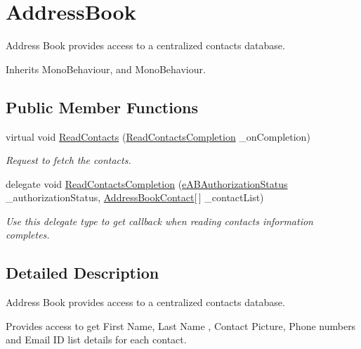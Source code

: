 \hypertarget{class_voxel_busters_1_1_native_plugins_1_1_address_book}{}\section{Address\+Book}
\label{class_voxel_busters_1_1_native_plugins_1_1_address_book}


Address Book provides access to a centralized contacts database.  




Inherits Mono\+Behaviour, and Mono\+Behaviour.

\subsection*{Public Member Functions}
\begin{DoxyCompactItemize}
\item 
virtual void \hyperlink{class_voxel_busters_1_1_native_plugins_1_1_address_book_a4915a0fd5a78ea9aa35c251b763cd5fb}{Read\+Contacts} (\hyperlink{class_voxel_busters_1_1_native_plugins_1_1_address_book_a0556c7cb8692eea8cedddd0ff11108c1}{Read\+Contacts\+Completion} \+\_\+on\+Completion)
\begin{DoxyCompactList}\small\item\em Request to fetch the contacts. \end{DoxyCompactList}\item 
delegate void \hyperlink{class_voxel_busters_1_1_native_plugins_1_1_address_book_a0556c7cb8692eea8cedddd0ff11108c1}{Read\+Contacts\+Completion} (\hyperlink{namespace_voxel_busters_1_1_native_plugins_a52e7845cde15260bea7e2d269fd8711c}{e\+A\+B\+Authorization\+Status} \+\_\+authorization\+Status, \hyperlink{class_voxel_busters_1_1_native_plugins_1_1_address_book_contact}{Address\+Book\+Contact}\mbox{[}$\,$\mbox{]} \+\_\+contact\+List)
\begin{DoxyCompactList}\small\item\em Use this delegate type to get callback when reading contacts information completes. \end{DoxyCompactList}\end{DoxyCompactItemize}


\subsection{Detailed Description}
Address Book provides access to a centralized contacts database. 

Provides access to get First Name, Last Name , Contact Picture, Phone numbers and Email I\+D list details for each contact.  

